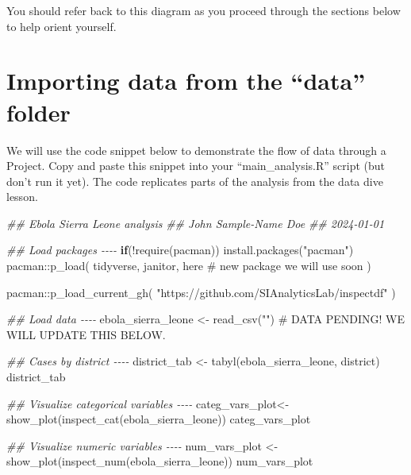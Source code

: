 \documentclass[
  letterpaper,
  DIV=11,
  numbers=noendperiod]{scrreprt}
\newenvironment{Shaded}{\begin{snugshade}}{\end{snugshade}}
\newcommand{\CommentTok}[1]{\textcolor[rgb]{0.37,0.37,0.37}{#1}}
\newcommand{\ControlFlowTok}[1]{\textcolor[rgb]{0.00,0.23,0.31}{\textbf{#1}}}
\newcommand{\DocumentationTok}[1]{\textcolor[rgb]{0.37,0.37,0.37}{\textit{#1}}}
\newcommand{\FunctionTok}[1]{\textcolor[rgb]{0.28,0.35,0.67}{#1}}
\newcommand{\NormalTok}[1]{\textcolor[rgb]{0.00,0.23,0.31}{#1}}
\newcommand{\OtherTok}[1]{\textcolor[rgb]{0.00,0.23,0.31}{#1}}
\newcommand{\SpecialCharTok}[1]{\textcolor[rgb]{0.37,0.37,0.37}{#1}}
\newcommand{\StringTok}[1]{\textcolor[rgb]{0.13,0.47,0.30}{#1}}
\begin{document}
You should refer back to this diagram as you proceed through the
sections below to help orient yourself.

\section{Importing data from the ``data''
folder}\label{importing-data-from-the-data-folder}

We will use the code snippet below to demonstrate the flow of data
through a Project. Copy and paste this snippet into your
``main\_analysis.R'' script (but don't run it yet). The code replicates
parts of the analysis from the data dive lesson.

\begin{Shaded}
\begin{Highlighting}[]
\DocumentationTok{\#\# Ebola Sierra Leone analysis}
\DocumentationTok{\#\# John Sample{-}Name Doe}
\DocumentationTok{\#\# 2024{-}01{-}01}


\DocumentationTok{\#\# Load packages {-}{-}{-}{-}}
\ControlFlowTok{if}\NormalTok{(}\SpecialCharTok{!}\FunctionTok{require}\NormalTok{(pacman)) }\FunctionTok{install.packages}\NormalTok{(}\StringTok{"pacman"}\NormalTok{)}
\NormalTok{pacman}\SpecialCharTok{::}\FunctionTok{p\_load}\NormalTok{(}
\NormalTok{  tidyverse,}
\NormalTok{  janitor,}
\NormalTok{  here }\CommentTok{\# new package we will use soon}
\NormalTok{)}

\NormalTok{pacman}\SpecialCharTok{::}\FunctionTok{p\_load\_current\_gh}\NormalTok{(}
  \StringTok{"https://github.com/SIAnalyticsLab/inspectdf"}
\NormalTok{)}

\DocumentationTok{\#\# Load data {-}{-}{-}{-}}
\NormalTok{ebola\_sierra\_leone }\OtherTok{\textless{}{-}} \FunctionTok{read\_csv}\NormalTok{(}\StringTok{""}\NormalTok{) }\CommentTok{\# DATA PENDING! WE WILL UPDATE THIS BELOW.}

\DocumentationTok{\#\# Cases by district {-}{-}{-}{-}}
\NormalTok{district\_tab }\OtherTok{\textless{}{-}} \FunctionTok{tabyl}\NormalTok{(ebola\_sierra\_leone, district)}
\NormalTok{district\_tab}

\DocumentationTok{\#\# Visualize categorical variables {-}{-}{-}{-}}
\NormalTok{categ\_vars\_plot}\OtherTok{\textless{}{-}} \FunctionTok{show\_plot}\NormalTok{(}\FunctionTok{inspect\_cat}\NormalTok{(ebola\_sierra\_leone))}
\NormalTok{categ\_vars\_plot}

\DocumentationTok{\#\# Visualize numeric variables {-}{-}{-}{-}}
\NormalTok{num\_vars\_plot }\OtherTok{\textless{}{-}} \FunctionTok{show\_plot}\NormalTok{(}\FunctionTok{inspect\_num}\NormalTok{(ebola\_sierra\_leone))}
\NormalTok{num\_vars\_plot}
\end{Highlighting}
\end{Shaded}
\end{document}
